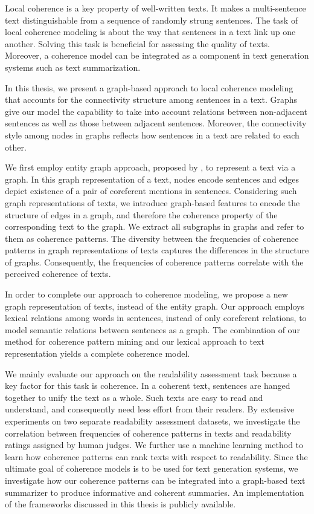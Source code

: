 
\addchap*{\abstractname}

Local coherence is a key property of well-written texts. It makes a multi-sentence text distinguishable from a sequence of randomly strung sentences. 
The task of local coherence modeling is about the way that sentences in a text link up one another.  
Solving this task is beneficial for assessing the quality of texts. 
Moreover, a coherence model can be integrated as a component in text generation systems such as text summarization. 

In this thesis, we present a graph-based approach to local coherence modeling that accounts for the connectivity structure among sentences in a text. 
Graphs give our model the capability to take into account relations between non-adjacent sentences as well as those between adjacent sentences. 
Moreover, the connectivity style among nodes in graphs reflects how sentences in a text are related to each other. 

We first employ entity graph approach, proposed by , to represent a text via a graph. 
In this graph representation of a text, nodes encode sentences and edges depict existence of a pair of coreferent mentions in sentences.    
Considering such graph representations of texts, we introduce graph-based features to encode the structure of edges in a graph, and therefore the coherence property of the corresponding text to the graph.   
We extract all subgraphs in graphs and refer to them as coherence patterns. 
The diversity between the frequencies of coherence patterns in graph representations of texts captures the differences in the structure of graphs.  
Consequently, the frequencies of coherence patterns correlate with the perceived coherence of texts.  

In order to complete our approach to coherence modeling, we propose a new graph representation of texts, instead of the entity graph.  
Our approach employs lexical relations among words in sentences, instead of only coreferent relations, to model semantic relations between sentences as a graph. 
The combination of our method for coherence pattern mining and our lexical approach to text representation yields a complete coherence model. 

We mainly evaluate our approach on the readability assessment task because a key factor for this task is coherence. 
In a coherent text, sentences are hanged together to unify the text as a whole. 
Such texts are easy to read and understand, and consequently need less effort from their readers. 
By extensive experiments on two separate readability assessment datasets, 
we investigate the correlation between frequencies of coherence patterns in texts and readability ratings assigned by human judges.    
We further use a machine learning method to learn how coherence patterns can rank texts with respect to readability. 
Since the ultimate goal of coherence models is to be used for text generation systems, we investigate how our coherence patterns can be integrated into a graph-based text summarizer to produce informative and coherent summaries. 
An implementation of the frameworks discussed in this thesis is publicly available.


